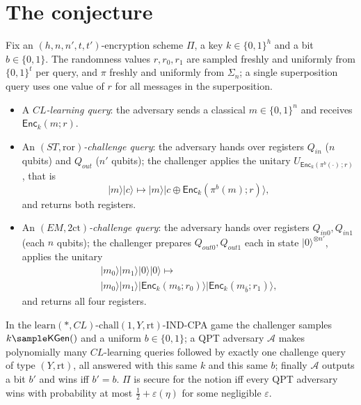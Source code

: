 \documentclass{conjura-conjecture}
\newcommand{\KGen}{\mathsf{KGen}}
\newcommand{\Enc}{\mathsf{Enc}}
\newcommand{\ror}{\mathrm{ror}}
\newcommand{\twoct}{2\mathrm{ct}}
\newcommand{\learn}{\mathrm{learn}}
\newcommand{\chall}{\mathrm{chall}}
\newcommand{\ket}[1]{|#1\rangle}
\begin{document}
\section{The conjecture}\label{sec:conjectures}

\begin{definition}\label{def:queries}
Fix an $(h,n,n',t,t')$-encryption scheme $\Pi$, a key
$k\in\{0,1\}^{h}$ and a bit $b\in\{0,1\}$. The randomness values
$r,r_0,r_1$ are sampled freshly and uniformly from $\{0,1\}^{t}$ per
query, and $\pi$ freshly and uniformly from $\Sigma_n$; a single
superposition query uses one value of $r$ for all messages in the
superposition.
\begin{itemize}
  \item A \emph{$CL$-learning query}: the adversary sends a classical
    $m\in\{0,1\}^{n}$ and receives $\Enc_k(m;r)$.
  \item An \emph{$(ST,\ror)$-challenge query}: the adversary hands over
    registers $Q_{in}$ ($n$ qubits) and $Q_{out}$ ($n'$ qubits); the
    challenger applies the unitary $U_{\Enc_k(\pi^{b}(\cdot)\,;r)}$,
    that is
    \[
      \ket{m}\ket{c}\mapsto\ket{m}\ket{c\oplus\Enc_k(\pi^{b}(m);r)},
    \]
    and returns both registers.
  \item An \emph{$(EM,\twoct)$-challenge query}: the adversary hands
    over registers $Q_{in0},Q_{in1}$ (each $n$ qubits); the challenger
    prepares $Q_{out0},Q_{out1}$ each in state $\ket{0}^{\otimes n'}$,
    applies the unitary
    \begin{multline*}
      \ket{m_0}\ket{m_1}\ket{0}\ket{0}\mapsto\\
      \ket{m_0}\ket{m_1}
        \ket{\Enc_k(m_b;r_0)}\ket{\Enc_k(m_{\bar b};r_1)},
    \end{multline*}
    and returns all four registers.
\end{itemize}
\end{definition}

\begin{definition}\label{def:indcpa}
In the $\learn(*,CL)$-$\chall(1,Y,\mathrm{rt})$-IND-CPA game the
challenger samples $k\sample\KGen()$ and a uniform $b\in\{0,1\}$; a QPT
adversary $\mathcal{A}$ makes polynomially many $CL$-learning queries
followed by exactly one challenge query of type $(Y,\mathrm{rt})$, all
answered with this same $k$ and this same $b$; finally $\mathcal{A}$
outputs a bit $b'$ and wins iff $b'=b$. $\Pi$ is secure for the notion
iff every QPT adversary wins with probability at most
$\tfrac12+\varepsilon(\eta)$ for some negligible $\varepsilon$.
\end{definition}
\end{document}
